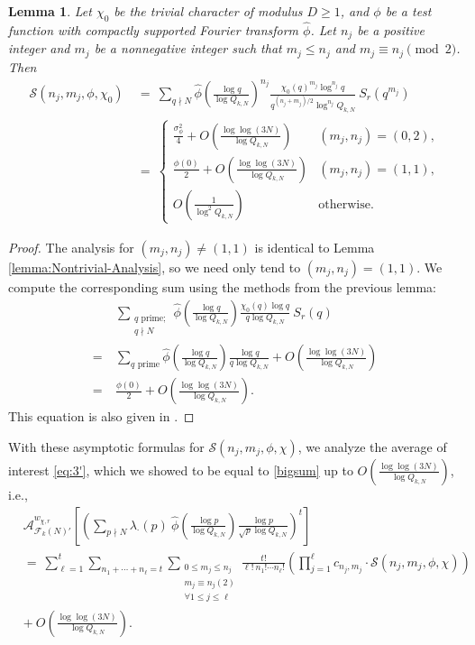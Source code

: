 \documentclass[12pt, reqno,oneside]{amsart}
\theoremstyle{plain}
\newtheorem{lemma}[theorem]{Lemma}
\theoremstyle{definition}
\theoremstyle{remark}
\theoremstyle{plain}
\numberwithin{equation}{section}
\begin{document}
\begin{lemma}\label{lemma:Trivial-Analysis}
Let $\chi_0$ be the trivial character of modulus $D\geq1$, and $\phi$ be a test function with compactly supported Fourier transform $\widehat{\phi}$. Let $n_j$ be a positive integer and $m_j$ be a nonnegative integer such that $m_j\leq n_j$ and $m_j\equiv n_j\pmod{2}$. Then  
\begin{align}
\nonumber
\mathcal{S}(n_j,m_j,\phi,\chi_0) \ &= \ \sum_{q\nmid N}\widehat{\phi}\left(\frac{\log q}{\log Q_{k,N}}\right)^{n_j}\frac{\chi_0(q)^{m_j}\log^{n_j} q}{q^{(n_j+m_j)/2}\log^{n_j} Q_{k,N}} \ S_r\left(q^{m_j}\right) \\ 
&= \ \begin{cases}
\frac{\sigma_\phi^2}{4}+O\left(\frac{\log\log(3N)}{\log Q_{k,N}}\right) & (m_j,n_j)=(0,2), \\
\frac{\phi(0)}{2}+O\left(\frac{\log\log(3N)}{\log Q_{k,N}}\right) & (m_j,n_j)=(1,1), \\
O\left(\frac{1}{\log^2Q_{k,N}}\right) & \text{otherwise}.
\end{cases}
\end{align}
\end{lemma}
\begin{proof}
The analysis for $(m_j,n_j)\neq(1,1)$ is identical to Lemma \ref{lemma:Nontrivial-Analysis}, so we need only tend to $(m_j,n_j)=(1,1)$. We compute the corresponding sum using the methods from the previous lemma:
\begin{align}
\nonumber
&\sum_{\substack{q\text{ prime}; \\ q\nmid N}}\widehat{\phi}\left(\frac{\log q}{\log Q_{k,N}}\right)\frac{\chi_0(q)\log q}{q\log Q_{k,N}} \ S_r(q)\\ 
\nonumber
= \ & \sum_{q\text{ prime}}\widehat{\phi}\left(\frac{\log q}{\log Q_{k,N}}\right)\frac{\log q}{q\log Q_{k,N}}+O\left(\frac{\log\log(3N)}{\log Q_{k,N}}\right) \\
= \ & \frac{\phi(0)}{2} + O\left(\frac{\log\log(3N)}{\log Q_{k,N}}\right).
\end{align}
This equation is also given in \cite[164]{KR18}.
\end{proof}
With these asymptotic formulas for $\mathcal{S}(n_j,m_j,\phi,\chi)$, we analyze the average of interest \eqref{eq:3'}, which we showed to be equal to \eqref{bigsum} up to $O(\frac{\log\log(3N)}{\log Q_{k,N}})$, i.e.,
\begin{align}\nonumber
&\mathcal{A}^{w_{\chi,r}}_{\mathcal{F}_k(N)'}\left[\left(\sum\nolimits_{p\nmid N}\lambda_\cdot(p) \ \widehat{\phi}\left(\frac{\log p}{\log Q_{k,N}}\right)\frac{\log p}{\sqrt{p}\log Q_{k,N}}\right)^t\right] \\ 
\label{bigsum'}
&= \ \sum_{\ell=1}^t\sum_{n_1+\cdots+n_\ell=t}\sum_{\substack{0\leq m_j\leq n_j \\ m_j\equiv n_j(2) \\ \forall1\leq j\leq\ell}}\frac{t!}{\ell! \ n_1!\cdots n_\ell!}\left(\prod_{j=1}^\ell c_{n_j,m_j}\cdot \mathcal{S}(n_j,m_j,\phi,\chi)\right)\\
\label{bigsum'-error}
&+ \ O\left(\frac{\log\log(3N)}{\log Q_{k,N}}\right).
\end{align}
\end{document}
